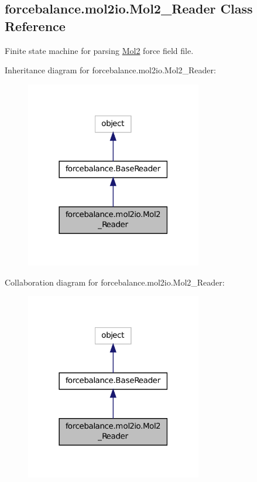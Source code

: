 \hypertarget{classforcebalance_1_1mol2io_1_1Mol2__Reader}{\subsection{forcebalance.\-mol2io.\-Mol2\-\_\-\-Reader Class Reference}
\label{classforcebalance_1_1mol2io_1_1Mol2__Reader}
}


Finite state machine for parsing \hyperlink{namespaceforcebalance_1_1Mol2}{Mol2} force field file.  




Inheritance diagram for forcebalance.\-mol2io.\-Mol2\-\_\-\-Reader\-:
\nopagebreak
\begin{figure}[H]
\begin{center}
\leavevmode
\includegraphics[width=218pt]{classforcebalance_1_1mol2io_1_1Mol2__Reader__inherit__graph}
\end{center}
\end{figure}


Collaboration diagram for forcebalance.\-mol2io.\-Mol2\-\_\-\-Reader\-:
\nopagebreak
\begin{figure}[H]
\begin{center}
\leavevmode
\includegraphics[width=218pt]{classforcebalance_1_1mol2io_1_1Mol2__Reader__coll__graph}
\end{center}
\end{figure}
